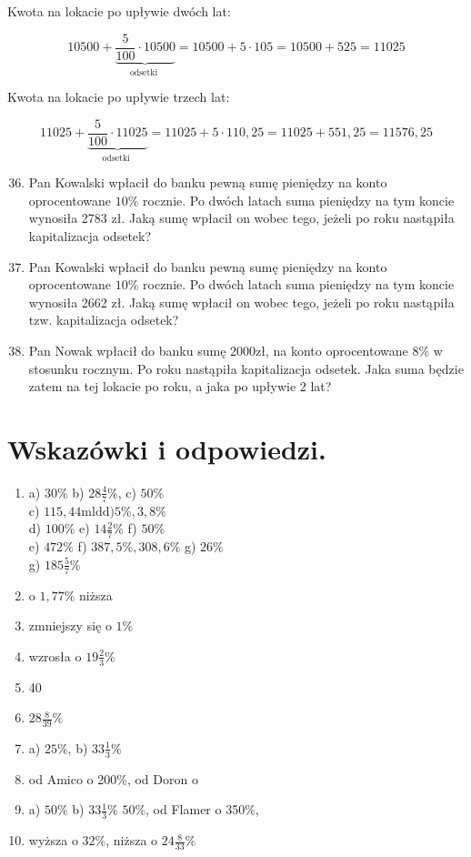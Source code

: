 \documentclass[10pt]{article}
\begin{document}
Kwota na lokacie po upływie dwóch lat:

\[
10500+\underbrace{\frac{5}{100} \cdot 10500}_{\text {odsetki }}=10500+5 \cdot 105=10500+525=11025
\]

Kwota na lokacie po upływie trzech lat:

\[
11025+\underbrace{\frac{5}{100} \cdot 11025}_{\text {odsetki }}=11025+5 \cdot 110,25=11025+551,25=11576,25
\]

\begin{enumerate}
  \setcounter{enumi}{35}
  \item Pan Kowalski wpłacił do banku pewną sumę pieniędzy na konto oprocentowane \(10 \%\) rocznie. Po dwóch latach suma pieniędzy na tym koncie wynosiła 2783 zł. Jaką sumę wpłacił on wobec tego, jeżeli po roku nastąpiła kapitalizacja odsetek?
  \item Pan Kowalski wpłacił do banku pewną sumę pieniędzy na konto oprocentowane \(10 \%\) rocznie. Po dwóch latach suma pieniędzy na tym koncie wynosiła 2662 zł. Jaką sumę wpłacił on wobec tego, jeżeli po roku nastąpiła tzw. kapitalizacja odsetek?
  \item Pan Nowak wpłacił do banku sumę \(2000 \mathrm{zł}\), na konto oprocentowane \(8 \%\) w stosunku rocznym. Po roku nastąpiła kapitalizacja odsetek. Jaka suma będzie zatem na tej lokacie po roku, a jaka po upływie 2 lat?
\end{enumerate}

\section*{Wskazówki i odpowiedzi.}
\begin{enumerate}
  \item a) \(30 \%\) b) \(28 \frac{4}{7} \%\), c) \(50 \%\)\\
c) \(115,44 \mathrm{mld} \mathrm{d}) 5 \%, 3,8 \%\)\\
d) \(100 \%\) e) \(14 \frac{2}{7} \%\) f) \(50 \%\)\\
e) \(472 \%\) f) \(387,5 \%, 308,6 \%\) g) \(26 \%\)\\
g) \(185 \frac{5}{7} \%\)
  \item o \(1,77 \%\) niższa
  \item zmniejszy się o \(1 \%\)
  \item wzrosła o \(19 \frac{2}{3} \%\)
  \item 40
  \item \(28 \frac{8}{39} \%\)
  \item a) \(25 \%\), b) \(33 \frac{1}{3} \%\)
  \item od Amico o 200\%, od Doron o
  \item a) \(50 \%\) b) \(33 \frac{1}{3} \%\) \(50 \%\), od Flamer o 350\%,
  \item wyższa o \(32 \%\), niższa o \(24 \frac{8}{33} \%\)
\end{enumerate}
\end{document}
